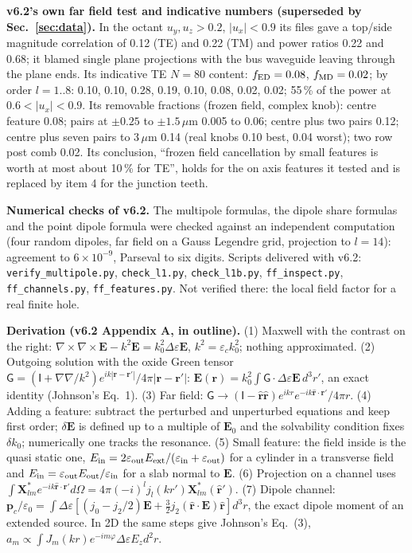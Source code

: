 \documentclass[11pt,a4paper]{article}
\begin{document}
\textbf{v6.2's own far field test and indicative numbers (superseded by Sec.~\ref{sec:data}).} In the octant
$u_y,u_z>0.2$, $|u_x|<0.9$ its files gave a top/side magnitude correlation of 0.12 (TE) and 0.22 (TM) and power
ratios 0.22 and 0.68; it blamed single plane projections with the bus waveguide leaving through the plane ends.
Its indicative TE $N=80$ content: $f_{\rm ED}=0.08$, $f_{\rm MD}=0.02$; by order $l=1..8$: 0.10, 0.10, 0.28,
0.19, 0.10, 0.08, 0.02, 0.02; 55\,\% of the power at $0.6<|u_x|<0.9$. Its removable fractions (frozen field,
complex knob): centre feature 0.08; pairs at $\pm0.25$ to $\pm1.5$\,$\mu$m 0.005 to 0.06; centre plus two pairs
0.12; centre plus seven pairs to 3\,$\mu$m 0.14 (real knobs 0.10 best, 0.04 worst); two row post comb 0.02. Its
conclusion, ``frozen field cancellation by small features is worth at most about 10\,\% for TE'', holds for the
on axis features it tested and is replaced by item 4 for the junction teeth.

\textbf{Numerical checks of v6.2.} The multipole formulas, the dipole share formulas and the point dipole
formula were checked against an independent computation (four random dipoles, far field on a Gauss Legendre
grid, projection to $l=14$): agreement to $6\times10^{-9}$, Parseval to six digits. Scripts delivered with v6.2:
\texttt{verify\_multipole.py}, \texttt{check\_l1.py}, \texttt{check\_l1b.py}, \texttt{ff\_inspect.py},
\texttt{ff\_channels.py}, \texttt{ff\_features.py}. Not verified there: the local field factor for a real finite
hole.

\textbf{Derivation (v6.2 Appendix A, in outline).} (1) Maxwell with the contrast on the right:
$\nabla\times\nabla\times\mathbf E-k^2\mathbf E=k_0^2\Delta\varepsilon\mathbf E$, $k^2=\varepsilon_ck_0^2$; nothing
approximated. (2) Outgoing solution with the oxide Green tensor
$\mathsf G=(\mathsf I+\nabla\nabla/k^2)e^{ik|\mathbf r-\mathbf r'|}/4\pi|\mathbf r-\mathbf r'|$:
$\mathbf E(\mathbf r)=k_0^2\int\mathsf G\cdot\Delta\varepsilon\mathbf E\,d^3r'$, an exact identity (Johnson's
Eq.~1). (3) Far field: $\mathsf G\to(\mathsf I-\hat{\mathbf r}\hat{\mathbf r})e^{ikr}e^{-ik\hat{\mathbf r}\cdot\mathbf r'}/4\pi r$.
(4) Adding a feature: subtract the perturbed and unperturbed equations and keep first order; $\delta\mathbf E$ is
defined up to a multiple of $\mathbf E_0$ and the solvability condition fixes $\delta k_0$; numerically one
tracks the resonance. (5) Small feature: the field inside is the quasi static one,
$E_{\rm in}=2\varepsilon_{\rm out}E_{\rm ext}/(\varepsilon_{\rm in}+\varepsilon_{\rm out})$ for a cylinder in a
transverse field and $E_{\rm in}=\varepsilon_{\rm out}E_{\rm out}/\varepsilon_{\rm in}$ for a slab normal to
$\mathbf E$. (6) Projection on a channel uses
$\int\mathbf X^*_{lm}e^{-ik\hat{\mathbf r}\cdot\mathbf r'}d\Omega=4\pi(-i)^lj_l(kr')\mathbf X^*_{lm}(\hat{\mathbf r}')$.
(7) Dipole channel:
$\mathbf p_c/\varepsilon_0=\int\Delta\varepsilon[(j_0-j_2/2)\mathbf E+\tfrac32j_2(\hat{\mathbf r}\cdot\mathbf E)\hat{\mathbf r}]d^3r$,
the exact dipole moment of an extended source. In 2D the same steps give Johnson's Eq.~(3),
$a_m\propto\int J_m(kr)e^{-im\varphi}\Delta\varepsilon E_zd^2r$.
\end{document}
